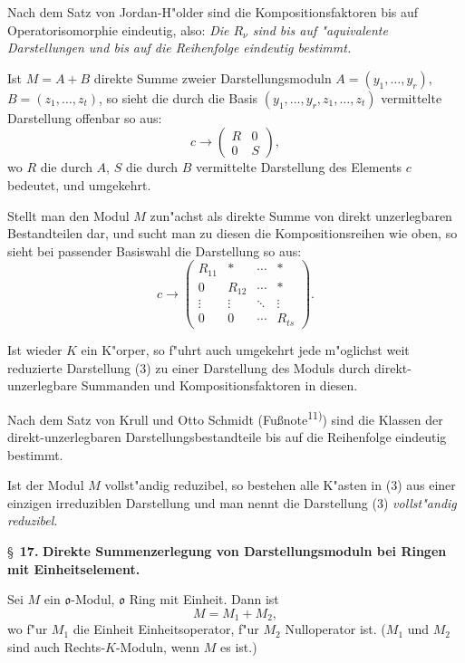 \documentclass[12pt,a4paper]{article}
\theoremstyle{plain}
\begin{document}
Nach dem Satz von Jordan-H"older sind die Kompositionsfaktoren bis auf Operatorisomorphie eindeutig, also: \textit{Die $R_\nu$ sind bis auf "aquivalente Darstellungen und bis auf die Reihenfolge eindeutig bestimmt.}

Ist $M = A + B$ direkte Summe zweier Darstellungsmoduln $A = (y_1,\ldots,y_r)$, $B = (z_1,\ldots,z_t)$, so sieht die durch die Basis $(y_1,\ldots,y_r,z_1,\ldots,z_t)$ vermittelte Darstellung offenbar so aus:
\[
c \to \begin{pmatrix} R & 0 \\ 0 & S \end{pmatrix},
\]
wo $R$ die durch $A$, $S$ die durch $B$ vermittelte Darstellung des Elements $c$ bedeutet, und umgekehrt.

Stellt man den Modul $M$ zun"achst als direkte Summe von direkt unzerlegbaren Bestandteilen dar, und sucht man zu diesen die Kompositionsreihen wie oben, so sieht bei passender Basiswahl die Darstellung so aus:
\[
c \to \begin{pmatrix}
R_{11} & * & \cdots & * \\
0 & R_{12} & \cdots & * \\
\vdots & \vdots & \ddots & \vdots \\
0 & 0 & \cdots & R_{ts}
\end{pmatrix}.\tag{3}
\]

Ist wieder $K$ ein K"orper, so f"uhrt auch umgekehrt jede m"oglichst weit reduzierte Darstellung (3) zu einer Darstellung des Moduls durch direkt-unzerlegbare Summanden und Kompositionsfaktoren in diesen.

Nach dem Satz von Krull und Otto Schmidt (Fu\ss note\textsuperscript{11)}) sind die Klassen der direkt-unzerlegbaren Darstellungsbestandteile bis auf die Reihenfolge eindeutig bestimmt.

Ist der Modul $M$ vollst"andig reduzibel, so bestehen alle K"asten in (3) aus einer einzigen irreduziblen Darstellung und man nennt die Darstellung (3) \textit{vollst"andig reduzibel}.

\newpage
\S~\textbf{17.}
\textbf{Direkte Summenzerlegung von Darstellungsmoduln bei Ringen mit Einheitselement.}

\smallskip

\noindent
Sei $M$ ein $\mathfrak{o}$-Modul, $\mathfrak{o}$ Ring mit Einheit. Dann ist
\[
M = M_1 + M_2,
\]
wo f"ur $M_1$ die Einheit Einheitsoperator, f"ur $M_2$ Nulloperator ist. ($M_1$ und $M_2$ sind auch Rechts-$K$-Moduln, wenn $M$ es ist.)
\end{document}
